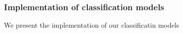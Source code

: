 \subsubsection{Implementation of classification models}

We present the implementation of our classificatin models
